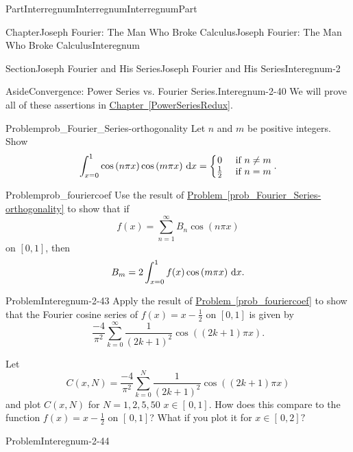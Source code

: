 \documentclass[oneside,10pt,]{book}
\newcommand{\xreffont}{\relax}
\numberwithin{equation}{part}
\newcommand{\dx}[1]{\,{\rm d}#1}
\newcommand{\amp}{&}
\begin{document}
\begin{partptx}{Part}{Interregnum}{}{Interregnum}{}{}{InterregnumPart}
\begin{chapterptx}{Chapter}{Joseph Fourier: The Man Who Broke Calculus}{}{Joseph Fourier: The Man Who Broke Calculus}{}{}{Interegnum}
\begin{sectionptx}{Section}{Joseph Fourier and His Series}{}{Joseph Fourier and His Series}{}{}{Interegnum-2}
\begin{aside}{Aside}{Convergence: Power Series vs. Fourier Series.}{Interegnum-2-40}%
We will prove all of these assertions in \hyperref[PowerSeriesRedux]{Chapter~{\xreffont\ref{PowerSeriesRedux}}}.%
\end{aside}
\begin{problem}{Problem}{}{prob_Fourier_Series-orthogonality}%
Let \(n\) and \(m\) be positive integers. Show%
\begin{equation*}
\int_{x=0}^1\cos\left(n\pi x\right)\cos\left(m\pi x\right)\dx{ x}=\left\{ \begin{matrix}0\amp \text{ if } n\neq m\\ \frac{1}{2}\amp \text{ if } n=m \end{matrix} \right.\text{.}
\end{equation*}
%
\end{problem}
\begin{problem}{Problem}{}{prob_fouriercoef}%
Use the result of \hyperref[prob_Fourier_Series-orthogonality]{Problem~{\xreffont\ref{prob_Fourier_Series-orthogonality}}} to show that if%
\begin{equation*}
f(x)=\sum_{n=1}^\infty B_n\cos\left(n\pi x\right)
\end{equation*}
on \([0,1]\), then%
\begin{equation}
B_m=2\int_{x=0}^1f(x)\cos\left(m\pi x\right)\dx{ x}.{}\label{EQUATIONCosineCoeffFourier}
\end{equation}
%
\end{problem}
\begin{problem}{Problem}{}{Interegnum-2-43}%
Apply the result of \hyperref[prob_fouriercoef]{Problem~{\xreffont\ref{prob_fouriercoef}}} to show that the Fourier cosine series of \(f(x)=x-\frac{1}{2}\) on \([0,1]\) is given by%
\begin{equation*}
\frac{-4}{\pi^2}\sum_{k=0}^\infty\frac{1}{\left(2k+1\right)^2}\cos \left((2k+1)\pi x\right)\text{.}
\end{equation*}
%
\par
Let%
\begin{equation*}
C(x,N)=\frac{-4}{\pi^2}\sum_{k=0}^N\frac{1}{\left(2k+1\right)^2}\cos
\left((2k+1)\pi x\right)
\end{equation*}
and plot \(C(x,N)\) for \(N=1,2,5,50\) \(x\in[\,0,1]\). How does this compare to the function \(f(x)=x-\frac{1}{2}\) on \([\,0,1]\)? What if you plot it for \(x\in[\,0,2]?\)%
\end{problem}
\begin{problem}{Problem}{}{Interegnum-2-44}%

\end{problem}
\end{sectionptx}
\end{chapterptx}
\end{partptx}
\end{document}
